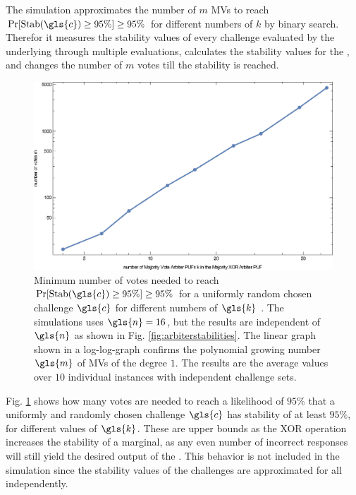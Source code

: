 The simulation approximates the number of $m$ \acp{MV} to reach $\Pr[\protect\Stab(\gls{c}) \ge 95 \%] \ge 95 \%$ for different numbers of $k$ by binary search.
Therefor it measures the stability values of every challenge evaluated by the underlying \mpufs through multiple evaluations, calculates the stability values for the \mxpuf, and changes the number of $m$ votes till the stability is reached.

\begin{figure}[ht]
\includegraphics[width=1.00\textwidth]{images/votes-stab-simulation.eps}
\caption[Number of votes need for large Majority \acs{XOR} \apufs]{Minimum number of votes needed to reach $\Pr[\protect\Stab(\gls{c}) \ge 95 \%] \ge 95 \%$ for a uniformly random chosen challenge $\gls{c}$ for different numbers of $\gls{k}$ \apufs. 
The simulations uses $\gls{n} = 16$, but the results are independent of $\gls{n}$ as shown in Fig. \ref{fig:arbiterstabilities}. 
The linear graph shown in a log-log-graph confirms the polynomial growing number $\gls{m}$ of \acp{MV} of the degree $1$.
The results are the average values over $10$ individual \puf instances with independent challenge sets.} 
\label{fig:majorityvotegrowth}
\end{figure}

Fig. \ref{fig:majorityvotegrowth} shows how many votes are needed to reach a likelihood of $95 \%$ that a uniformly and randomly chosen challenge $\gls{c}$ has stability of at least $95 \%$, for different values of $\gls{k}$.
These are upper bounds as the \ac{XOR} operation increases the stability of a \xpuf marginal, as any even number of incorrect \apuf responses will still yield the desired output of the \xpuf. 
This behavior is not included in the simulation since the stability values of the challenges are approximated for all \apufs independently.

